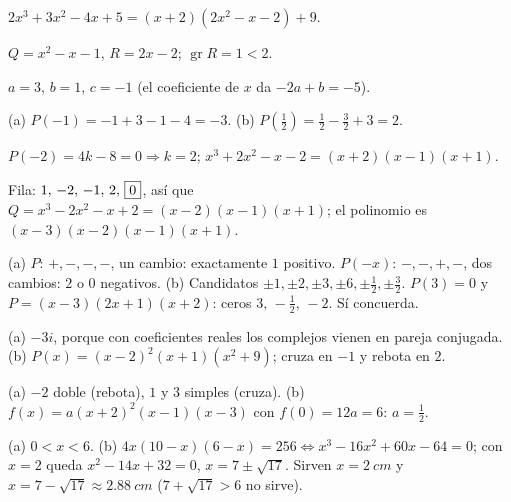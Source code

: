 \documentclass[11pt,a4paper]{article}
\newcommand{\gr}{\operatorname{gr}}
\begin{document}
\clearpage
\respuestas
\begin{respuestascortas}
\begin{soluciones}
\item $2x^3+3x^2-4x+5=(x+2)\left(2x^2-x-2\right)+9$.
\item $Q=x^2-x-1$, $R=2x-2$; $\gr R=1<2$.
\item $a=3$, $b=1$, $c=-1$ (el coeficiente de $x$ da $-2a+b=-5$).
\item (a) $P(-1)=-1+3-1-4=-3$. (b) $P\!\left(\tfrac12\right)=\tfrac12-\tfrac32+3=2$.
\item $P(-2)=4k-8=0\Rightarrow k=2$; $x^3+2x^2-x-2=(x+2)(x-1)(x+1)$.
\item Fila: $1,\,-2,\,-1,\,2,\,\fbox{$0$}$, así que $Q=x^3-2x^2-x+2=(x-2)(x-1)(x+1)$; el polinomio es $(x-3)(x-2)(x-1)(x+1)$.
\item (a) $P$: $+,-,-,-$, un cambio: exactamente $1$ positivo. $P(-x)$: $-,-,+,-$, dos cambios: $2$ o $0$ negativos.
  (b) Candidatos $\pm1,\pm2,\pm3,\pm6,\pm\tfrac12,\pm\tfrac32$. $P(3)=0$ y $P=(x-3)(2x+1)(x+2)$: ceros $3,\,-\tfrac12,\,-2$. Sí concuerda.
\item (a) $-3i$, porque con coeficientes reales los complejos vienen en pareja conjugada. (b) $P(x)=(x-2)^2(x+1)\left(x^2+9\right)$; cruza en $-1$ y rebota en $2$.
\item (a) $-2$ doble (rebota), $1$ y $3$ simples (cruza). (b) $f(x)=a(x+2)^2(x-1)(x-3)$ con $f(0)=12a=6$: $a=\tfrac12$.
\item (a) $0<x<6$. (b) $4x(10-x)(6-x)=256\iff x^3-16x^2+60x-64=0$; con $x=2$ queda $x^2-14x+32=0$, $x=7\pm\sqrt{17}$. Sirven $x=\SI{2}{cm}$ y $x=7-\sqrt{17}\approx\SI{2.88}{cm}$ ($7+\sqrt{17}>6$ no sirve).
\end{soluciones}
\end{respuestascortas}
\end{document}
